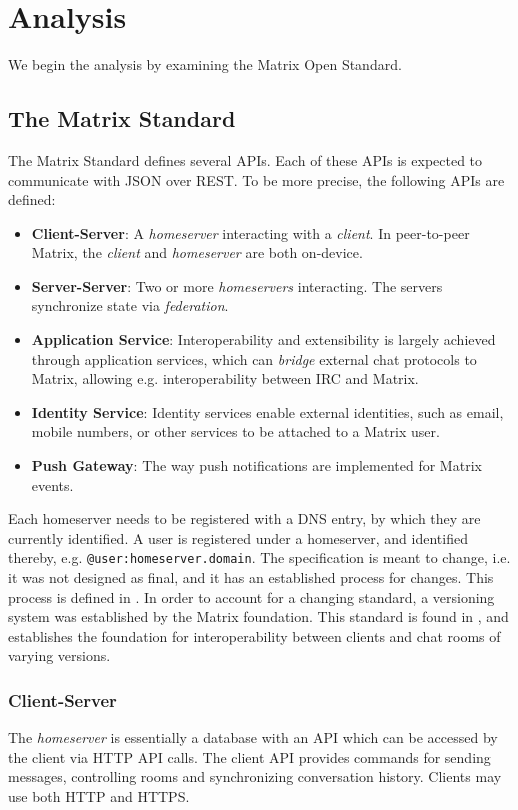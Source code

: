 \chapter{Analysis}
We begin the analysis by examining the Matrix Open Standard.

\section{The Matrix Standard}
The Matrix Standard defines several \ac{API}s.
Each of these \ac{API}s is expected to communicate with \ac{JSON} over \ac{REST}.
To be more precise, the following \ac{API}s are defined:
\begin{itemize}
    \item \textbf{Client-Server}: A \textit{homeserver} interacting with a \textit{client}. In peer-to-peer Matrix, the \textit{client} and \textit{homeserver} are both on-device.
    \item \textbf{Server-Server}: Two or more \textit{homeservers} interacting. The servers synchronize state via \textit{federation}.
    \item \textbf{Application Service}: Interoperability and extensibility is largely achieved through application services, which can \textit{bridge} external chat protocols to Matrix, allowing e.g. interoperability between \ac{IRC} and Matrix.
    \item \textbf{Identity Service}: Identity services enable external identities, such as email, mobile numbers, or other services to be attached to a Matrix user.
    \item \textbf{Push Gateway}: The way push notifications are implemented for Matrix events.
\end{itemize}

Each homeserver needs to be registered with a DNS entry, by which they are currently identified.
A user is registered under a homeserver, and identified thereby, e.g. \texttt{@user:homeserver.domain}.
The specification is meant to change, i.e. it was not designed as final, and it has an established process for changes.
This process is defined in \cite{matrix_org_spec_changes}.
In order to account for a changing standard, a versioning system was established by the Matrix foundation.
This standard is found in \cite{matrix_org_spec}, and establishes the foundation for interoperability between clients and chat rooms of varying versions.

\subsection{Client-Server}
The \textit{homeserver} is essentially a database with an \ac{API} which can be accessed by the client via \ac{HTTP} \ac{API} calls.
The client \ac{API} provides commands for sending messages, controlling rooms and synchronizing conversation history.
Clients may use both \ac{HTTP} and \ac{HTTPS}.

